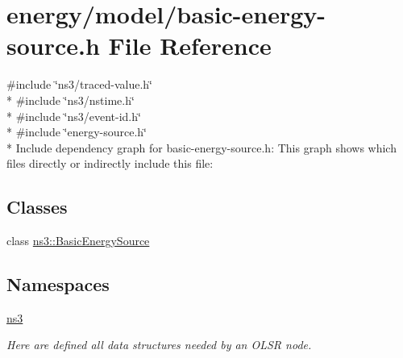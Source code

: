 \hypertarget{basic-energy-source_8h}{}\section{energy/model/basic-\/energy-\/source.h File Reference}
\label{basic-energy-source_8h}
{\ttfamily \#include \char`\"{}ns3/traced-\/value.\+h\char`\"{}}\\*
{\ttfamily \#include \char`\"{}ns3/nstime.\+h\char`\"{}}\\*
{\ttfamily \#include \char`\"{}ns3/event-\/id.\+h\char`\"{}}\\*
{\ttfamily \#include \char`\"{}energy-\/source.\+h\char`\"{}}\\*
Include dependency graph for basic-\/energy-\/source.h\+:
This graph shows which files directly or indirectly include this file\+:
\subsection*{Classes}
\begin{DoxyCompactItemize}
\item 
class \hyperlink{classns3_1_1BasicEnergySource}{ns3\+::\+Basic\+Energy\+Source}
\end{DoxyCompactItemize}
\subsection*{Namespaces}
\begin{DoxyCompactItemize}
\item 
 \hyperlink{namespacens3}{ns3}
\begin{DoxyCompactList}\small\item\em Here are defined all data structures needed by an O\+L\+SR node. \end{DoxyCompactList}\end{DoxyCompactItemize}

